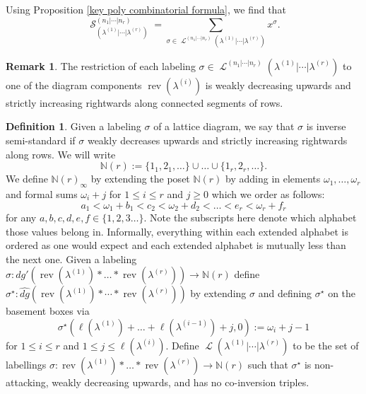 \documentclass[12pt,reqno]{amsart}
\theoremstyle{definition}
\newtheorem{defn}[thm]{Definition}
\newtheorem{remark}{Remark}
\DeclareMathOperator{\rev}{rev}
\DeclareMathOperator{\cS}{\mathcal{S}}
\DeclareMathOperator{\cL}{\mathcal{L}}
\begin{document}
Using Proposition \ref{key poly combinatorial formula}, we find that 
\begin{equation}\label{combinatorial formula eq}
    \cS_{(\lambda^{(1)}|\cdots |\lambda^{(r)})}^{(n_1|\cdots|n_r)} = \sum_{\sigma \in \cL^{(n_1|\cdots|n_r)}(\lambda^{(1)}|\cdots|\lambda^{(r)})} x^{\sigma}.
\end{equation}


\begin{remark}
    The restriction of each labeling $\sigma \in \cL^{(n_1|\cdots|n_r)}(\lambda^{(1)}|\cdots|\lambda^{(r)})$ to one of the diagram components $\rev(\lambda^{(i)})$ is weakly decreasing upwards and strictly increasing rightwards along connected segments of rows.
\end{remark}


\begin{defn}
    Given a labeling $\sigma$ of a lattice diagram, we say that $\sigma$ is inverse semi-standard if $\sigma$ weakly decreases upwards and strictly increasing rightwards along rows. We will write 
    $$\mathbb{N}(r):= \{1_1,2_1,\ldots\}\cup \ldots \cup \{1_r,2_r,\ldots \}.$$ We define $\mathbb{N}(r)_{\infty}$ by extending the poset $\mathbb{N}(r)$ by adding in elements   $\omega_1,\ldots,\omega_r$ and formal sums $\omega_i + j$ for $1\leq i \leq r$ and $j \geq 0$ which we order as follows:
    $$a_1 < \omega_1 + b_1 < c_2 < \omega_2 + d_2 < \ldots < e_r < \omega_r + f_r$$ for any $a,b,c,d,e,f \in \{1,2,3\ldots\}.$ Note the subscripts here denote which alphabet those values belong in. Informally, everything within each extended alphabet is ordered as one would expect and each extended alphabet is mutually less than the next one. Given a labeling $\sigma: dg'(\rev(\lambda^{(1)})*\ldots * \rev(\lambda^{(r)})) \rightarrow \mathbb{N}(r)$ define $\sigma^{\star}:\widehat{dg}(\rev(\lambda^{(1)})*\cdots * \rev(\lambda^{(r)}))$ by extending $\sigma$ and defining $\sigma^{\star}$ on the basement boxes via 
    $$\sigma^{\star}(\ell(\lambda^{(1)})+\ldots + \ell(\lambda^{(i-1)}) + j,0):= \omega_i + j -1 $$ for $1\leq i \leq r$ and $1 \leq j \leq \ell(\lambda^{(i)}).$
    Define $\cL(\lambda^{(1)}|\cdots |\lambda^{(r)})$ to be the set of labellings $\sigma: \rev(\lambda^{(1)})*\ldots * \rev(\lambda^{(r)}) \rightarrow \mathbb{N}(r)$ such that $\sigma^{\star}$ 
    is non-attacking, weakly decreasing upwards, and has no co-inversion triples.
\end{defn}
\end{document}
